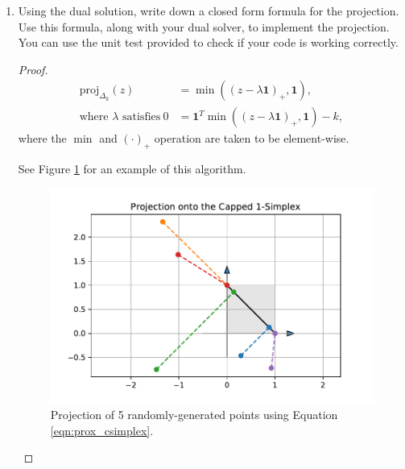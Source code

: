 \documentclass[11pt]{amsart}
\begin{document}
\begin{enumerate}
\begin{enumerate}
\item Using the dual solution, write down a closed form formula for the projection.  
Use this formula, along with your dual solver, to implement the projection. You can use the unit test 
provided to check if your code is working correctly.

\begin{proof}
  \begin{align}
    \mbox{proj}_{\Delta_k}(z)
    &= \min\left(\left(z - \lambda\mathbf{1}\right)_+, \mathbf{1}\right),
      \label{eqn:prox_csimplex} \\
    \text{where $\lambda$ satisfies}~
    0 &= \mathbf{1}^T\min\left(\left(z - \lambda\mathbf{1}\right)_+, \mathbf{1}\right) - k,
    \nonumber
  \end{align}
  where the $\min$ and $\left(\cdot\right)_+$ operation are taken to be
  element-wise.
  
  See Figure \ref{fig:prox_csimplex} for an example of this algorithm.
  \begin{figure}
    \centering
    \includegraphics{prox_csimplex.pdf}
    \caption{Projection of 5 randomly-generated points using Equation \ref{eqn:prox_csimplex}.}
    \label{fig:prox_csimplex}
  \end{figure}
\end{proof}

\end{enumerate}

\end{enumerate}
\end{document}
